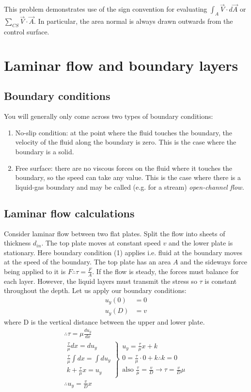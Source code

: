 \documentclass[class=report, crop=false, 12pt,a4paper]{standalone}
\begin{document}
This problem demonstrates use of the sign convention for evaluating $\int_A \vec{V} \cdot d\vec{A}$ or $\sum_{CS} \vec{V} \cdot \vec{A}$. In particular, the area normal is always drawn outwards from the control surface.
\section{Laminar flow and boundary layers}
\subsection{Boundary conditions}
You will generally only come across two types of boundary conditions:
\begin{enumerate}[noitemsep]
  \item No-slip condition: at the point where the fluid touches the boundary, the velocity of the fluid along the boundary is zero. This is the case where the boundary is a solid.
  \item Free surface: there are no viscous forces on the fluid where it touches the boundary, so the speed can take any value. This is the case where there is a liquid-gas boundary and may be called (e.g. for a stream) \emph{open-channel flow.}
\end{enumerate}
\subsection{Laminar flow calculations}
Consider laminar flow between two flat plates. Split the flow into sheets of thickness \(d_{in}\). The top plate moves at constant speed \(v\) and the lower plate is stationary. Here boundary condition (1) applies i.e. fluid at the boundary moves at the speed of the boundary. The top plate has an area \(A\) and the sideways force being applied to it is \(F \therefore \tau = \frac{F}{A} \). If the flow is steady, the forces must balance for each layer. However, the liquid layers must transmit the stress so \(\tau\) is constant throughout the depth. Let us apply our boundary conditions:
\begin{align}
  u_y(0) &= 0 \\ 
  u_y(D) &= v
\end{align}
where D is the vertical distance between the upper and lower plate.
\begin{gather} 
  \therefore \tau = \mu \frac{du_y}{dx} \\
  \left.
    \begin{array}{r}
      \frac{\tau}{\mu} dx = du_y \\
      \frac{\tau}{\mu}\int dx = \int du_y \\
      k + \frac{\tau}{\mu}x = u_y
    \end{array}
  \right\}
  \begin{array}{l}
    u_y = \frac{\tau}{\mu}x + k \\
    0 = \frac{\tau}{\mu}\cdot 0 +k \therefore k = 0 \\
    \textrm{also } \frac{\tau}{\mu} = \frac{v}{D} \rightarrow \tau = \frac{v}{D}\mu
  \end{array}\\
  \therefore u_y = \frac{v}{D}x
\end{gather}
\end{document}
